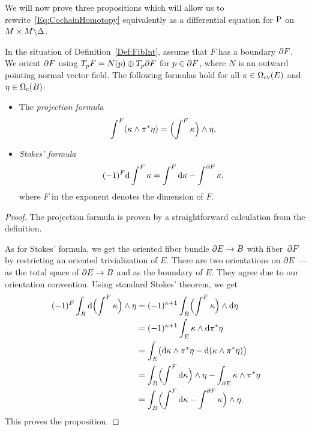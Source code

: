 \documentclass[\MainFolder/Text.tex]{subfiles}
\begin{document}
We will now prove three propositions which will allow us to rewrite~\eqref{Eq:CochainHomotopy} equivalently as a differential equation for $\mathrm{P}$ on $M\times M \backslash \Delta$.


\begin{Proposition}\label{Prop:StokesForm}
In the situation of Definition~\ref{Def:FibInt},
assume that $F$ has a boundary $\partial F$. We orient $\partial F$ using $T_p F = N(p)\oplus T_p \partial F$ for $p\in \partial F$, where $N$ is an outward pointing normal vector field.
The following formulas hold for all $\kappa\in \Omega_{\mathrm{cv}}(E)$ and $\eta\in \Omega_{\mathrm{c}}(B)$:
\begin{itemize}
\item The \emph{projection formula}
$$\int^{F}(\kappa\wedge \pi^* \eta) = \Bigl(\int^{F}\kappa\Bigr)\wedge \eta, $$
\item \emph{Stokes' formula}
$$(-1)^F \mathrm{d} \int^{F}\kappa  = \int^{F} \mathrm{d} \kappa -  \int^{\partial F} \kappa, $$
where $F$ in the exponent denotes the dimension of $F$.
\end{itemize}
\end{Proposition} 
%
\begin{proof} %
The projection formula is proven by a straightforward calculation from the definition.

As for Stokes' formula, we get the oriented fiber bundle $\partial E \rightarrow B$ with fiber~$\partial F$ by restricting an oriented trivialization of $E$. There are two orientations on $\partial E$ --- as the total space of $\partial E \rightarrow B$ and as the boundary of $E$. They agree due to our orientation convention. Using standard Stokes' theorem, we get
\allowdisplaybreaks
\begin{align*}
 (-1)^F \int_B \mathrm{d} \Bigl(\int^{F}\kappa\Bigr) \wedge \eta & = (-1)^{\kappa + 1} \int_B \Bigl(\int^{F}\kappa\Bigr)\wedge \mathrm{d} \eta \\ &=  (-1)^{\kappa + 1} \int_{E} \kappa \wedge \mathrm{d} \pi^*\eta \\
  & = \int_E \bigl(\mathrm{d} \kappa \wedge \pi^*\eta - \mathrm{d}(\kappa \wedge\pi^*\eta)\bigr) \\ 
  &= \int_B \Bigl(\int^{F} \mathrm{d} \kappa\Bigr) \wedge \eta - \int_{\partial E} \kappa \wedge \pi^*\eta \\ 
  &= \int_B \Bigl(\int^{F} \mathrm{d} \kappa - \int^{\partial F}\kappa \Bigr) \wedge \eta.
\end{align*}
This proves the proposition.
\end{proof}
\end{document}
